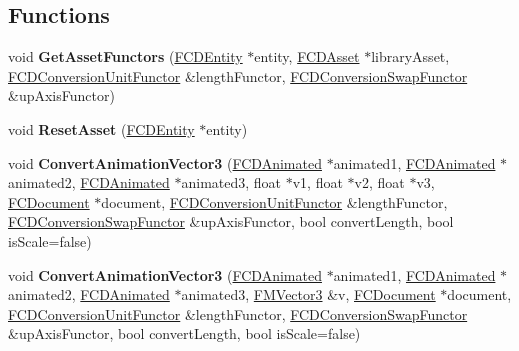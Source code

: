\subsection*{Functions}
\begin{DoxyCompactItemize}
\item 
\hypertarget{namespaceFCDocumentTools_aa466471eb25a837aee34a6524bf7990a}{
void {\bfseries GetAssetFunctors} (\hyperlink{classFCDEntity}{FCDEntity} $\ast$entity, \hyperlink{classFCDAsset}{FCDAsset} $\ast$libraryAsset, \hyperlink{classFCDocumentTools_1_1FCDConversionUnitFunctor}{FCDConversionUnitFunctor} \&lengthFunctor, \hyperlink{classFCDocumentTools_1_1FCDConversionSwapFunctor}{FCDConversionSwapFunctor} \&upAxisFunctor)}
\label{namespaceFCDocumentTools_aa466471eb25a837aee34a6524bf7990a}

\item 
\hypertarget{namespaceFCDocumentTools_aca3e2473e0dff989b87e7dcdd1aa1c74}{
void {\bfseries ResetAsset} (\hyperlink{classFCDEntity}{FCDEntity} $\ast$entity)}
\label{namespaceFCDocumentTools_aca3e2473e0dff989b87e7dcdd1aa1c74}

\item 
\hypertarget{namespaceFCDocumentTools_a2b86a9e419988a519ff68d9a82a01540}{
void {\bfseries ConvertAnimationVector3} (\hyperlink{classFCDAnimated}{FCDAnimated} $\ast$animated1, \hyperlink{classFCDAnimated}{FCDAnimated} $\ast$animated2, \hyperlink{classFCDAnimated}{FCDAnimated} $\ast$animated3, float $\ast$v1, float $\ast$v2, float $\ast$v3, \hyperlink{classFCDocument}{FCDocument} $\ast$document, \hyperlink{classFCDocumentTools_1_1FCDConversionUnitFunctor}{FCDConversionUnitFunctor} \&lengthFunctor, \hyperlink{classFCDocumentTools_1_1FCDConversionSwapFunctor}{FCDConversionSwapFunctor} \&upAxisFunctor, bool convertLength, bool isScale=false)}
\label{namespaceFCDocumentTools_a2b86a9e419988a519ff68d9a82a01540}

\item 
\hypertarget{namespaceFCDocumentTools_a45b69d1957ce4ca115eb4209f151a87f}{
void {\bfseries ConvertAnimationVector3} (\hyperlink{classFCDAnimated}{FCDAnimated} $\ast$animated1, \hyperlink{classFCDAnimated}{FCDAnimated} $\ast$animated2, \hyperlink{classFCDAnimated}{FCDAnimated} $\ast$animated3, \hyperlink{classFMVector3}{FMVector3} \&v, \hyperlink{classFCDocument}{FCDocument} $\ast$document, \hyperlink{classFCDocumentTools_1_1FCDConversionUnitFunctor}{FCDConversionUnitFunctor} \&lengthFunctor, \hyperlink{classFCDocumentTools_1_1FCDConversionSwapFunctor}{FCDConversionSwapFunctor} \&upAxisFunctor, bool convertLength, bool isScale=false)}
\label{namespaceFCDocumentTools_a45b69d1957ce4ca115eb4209f151a87f}


\end{DoxyCompactItemize}
